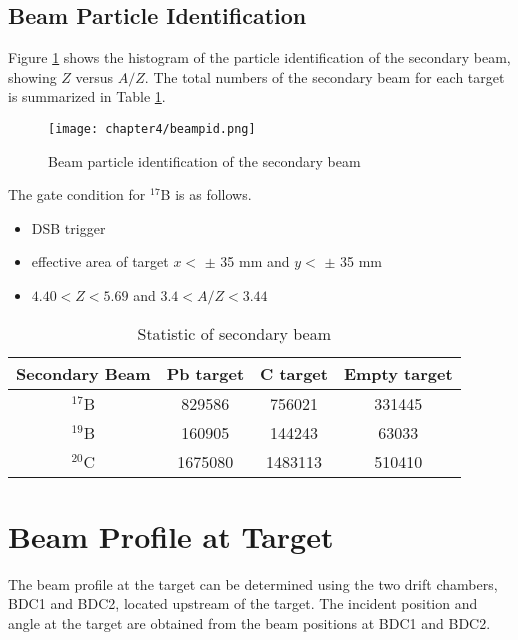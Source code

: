 \subsection{Beam Particle Identification}
Figure \ref{fig:Beam_PID} shows the histogram of the particle identification of the secondary beam, showing $Z$ versus $A/Z$. The total numbers of the secondary beam for each target is summarized in Table \ref{tab:Beam_PID}.

\begin{figure}[t]
    \centering
    \texttt{[image: chapter4/beampid.png]}
    \caption[Secondary beam particle identification]{Beam particle identification of the secondary beam}
    \label{fig:Beam_PID}
\end{figure}

The gate condition for $^{17}$B is as follows.
\begin{itemize}
    \item DSB trigger 
    \item effective area of target $x <$ $\pm$ 35 mm and $y <$ $\pm$ 35 mm
    \item $4.40 < Z < 5.69$ and $3.4 < A/Z < 3.44$

\end{itemize}


\begin{table}[h]
    \centering
    \begin{tabular}{cccc}
        \hline
        Secondary Beam & Pb target & C target & Empty target\\             
        \hline
        ${}^{17}$B & 829586 & 756021 & 331445 \\
        ${}^{19}$B &  160905&  144243&  63033\\
        ${}^{20}$C &  1675080 & 1483113 & 510410 \\
        \hline
    \end{tabular}
    \caption{Statistic of secondary beam}
    \label{tab:Beam_PID}
\end{table}


\section{Beam Profile at Target}

The beam profile at the target can be determined using the two drift chambers, BDC1 and BDC2, located upstream of the target. The incident position and angle at the target are obtained from the beam positions at BDC1 and BDC2.

